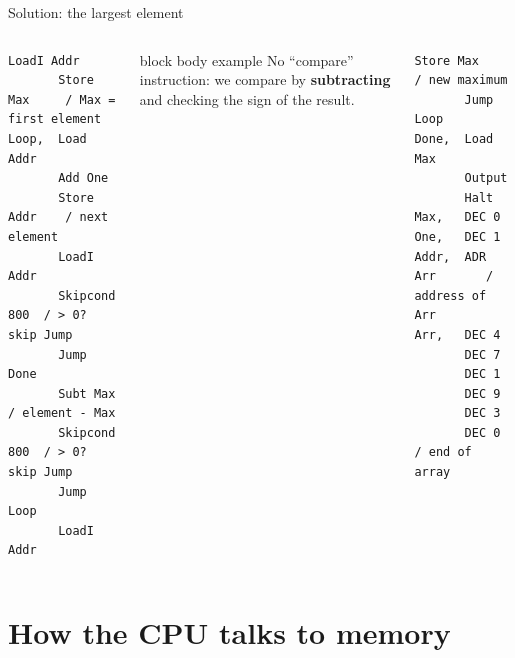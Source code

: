 \documentclass[aspectratio=169,10pt]{beamer}
\begin{document}
\begin{frame}[fragile]{Solution: the largest element}
  \begin{columns}[T,onlytextwidth]
\begin{lstlisting}[style=marie]
       LoadI Addr
       Store Max     / Max = first element
Loop,  Load Addr
       Add One
       Store Addr    / next element
       LoadI Addr
       Skipcond 800  / > 0? skip Jump
       Jump Done
       Subt Max      / element - Max
       Skipcond 800  / > 0? skip Jump
       Jump Loop
       LoadI Addr
\end{lstlisting}
      \vspace{0.1cm}
      \begin{beamercolorbox}[rounded=true,sep=0.1cm,wd=\linewidth]{block body example}
        \footnotesize No ``compare'' instruction: we compare by \textbf{subtracting} and checking the sign of the result.
      \end{beamercolorbox}
\begin{lstlisting}[style=marie, firstnumber=12]
       Store Max     / new maximum
       Jump Loop
Done,  Load Max
       Output
       Halt
Max,   DEC 0
One,   DEC 1
Addr,  ADR Arr       / address of Arr
Arr,   DEC 4
       DEC 7
       DEC 1
       DEC 9
       DEC 3
       DEC 0         / end of array
\end{lstlisting}
  \end{columns}
\end{frame}

\section{How the CPU talks to memory}
\end{document}
